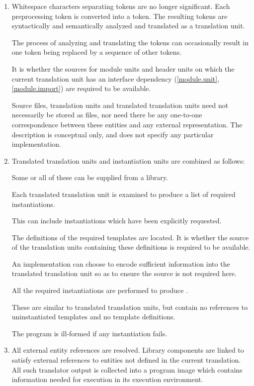 \begin{enumerate}
\item Whitespace characters separating tokens are no longer
significant. Each preprocessing token is converted into a
token. The resulting tokens are syntactically and
semantically analyzed and translated as a translation unit.
\begin{note}
The process of analyzing and translating the tokens can occasionally
result in one token being replaced by a sequence of other
tokens.
\end{note}
It is
whether the sources for
module units and header units
on which the current translation unit has an interface
dependency (\ref{module.unit}, \ref{module.import})
are required to be available.
\begin{note}
Source files, translation
units and translated translation units need not necessarily be stored as
files, nor need there be any one-to-one correspondence between these
entities and any external representation. The description is conceptual
only, and does not specify any particular implementation.
\end{note}

\item Translated translation units and instantiation units are combined
as follows:
\begin{note}
Some or all of these can be supplied from a
library.
\end{note}
Each translated translation unit is examined to
produce a list of required instantiations.
\begin{note}
This can include
instantiations which have been explicitly
requested.
\end{note}
The definitions of the
required templates are located. It is  whether the
source of the translation units containing these definitions is required
to be available.
\begin{note}
An implementation can choose to encode sufficient
information into the translated translation unit so as to ensure the
source is not required here.
\end{note}
All the required instantiations
are performed to produce
.
\begin{note}
These are similar
to translated translation units, but contain no references to
uninstantiated templates and no template definitions.
\end{note}
The
program is ill-formed if any instantiation fails.

\item All external entity references are resolved. Library
components are linked to satisfy external references to
entities not defined in the current translation. All such translator
output is collected into a program image which contains information
needed for execution in its execution environment.%
\end{enumerate}

